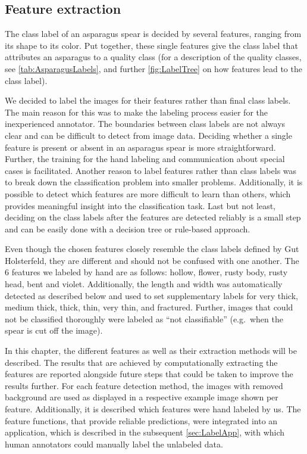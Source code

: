 \newpage

\subsection{Feature extraction}
\label{sec:AutomaticFeatureExtraction}

The class label of an asparagus spear is decided by several features, ranging from its shape to its color. Put together, these single features give the class label that attributes an asparagus to a quality class (for a description of the quality classes, see \autoref{tab:AsparagusLabels}, and further \autoref{fig:LabelTree} on how features lead to the class label).

\bigskip
We decided to label the images for their features rather than final class labels. The main reason for this was to make the labeling process easier for the inexperienced annotator. The boundaries between class labels are not always clear and can be difficult to detect from image data. Deciding whether a single feature is present or absent in an asparagus spear is more straightforward. Further, the training for the hand labeling and communication about special cases is facilitated. Another reason to label features rather than class labels was to break down the classification problem into smaller problems. Additionally, it is possible to detect which features are more difficult to learn than others, which provides meaningful insight into the classification task. Last but not least, deciding on the class labels after the features are detected reliably is a small step and can be easily done with a decision tree or rule-based approach.

Even though the chosen features closely resemble the class labels defined by Gut Holsterfeld, they are different and should not be confused with one another. The 6 features we labeled by hand are as follows: hollow, flower, rusty body, rusty head, bent and violet. Additionally, the length and width was automatically detected as described below and used to set supplementary labels for very thick, medium thick, thick, thin, very thin, and fractured. Further, images that could not be classified thoroughly were labeled as \enquote{not classifiable} (e.g.\ when the spear is cut off the image).

\bigskip
In this chapter, the different features as well as their extraction methods will be described. The results that are achieved by computationally extracting the features are reported alongside future steps that could be taken to improve the results further. For each feature detection method, the images with removed background are used as displayed in a respective example image shown per feature. Additionally, it is described which features were hand labeled by us. The feature functions, that provide reliable predictions, were integrated into an application, which is described in the subsequent \autoref{sec:LabelApp}, with which human annotators could manually label the unlabeled data.


